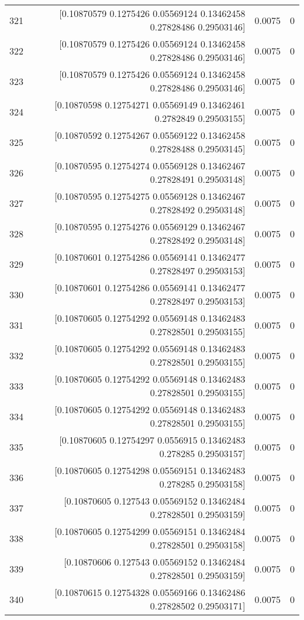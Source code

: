\begin{longtable}{lrrr}
321 & [0.10870579 0.1275426  0.05569124 0.13462458 0.27828486 0.29503146] & 0.0075 & 0 \\
322 & [0.10870579 0.1275426  0.05569124 0.13462458 0.27828486 0.29503146] & 0.0075 & 0 \\
323 & [0.10870579 0.1275426  0.05569124 0.13462458 0.27828486 0.29503146] & 0.0075 & 0 \\
324 & [0.10870598 0.12754271 0.05569149 0.13462461 0.2782849  0.29503155] & 0.0075 & 0 \\
325 & [0.10870592 0.12754267 0.05569122 0.13462458 0.27828488 0.29503145] & 0.0075 & 0 \\
326 & [0.10870595 0.12754274 0.05569128 0.13462467 0.27828491 0.29503148] & 0.0075 & 0 \\
327 & [0.10870595 0.12754275 0.05569128 0.13462467 0.27828492 0.29503148] & 0.0075 & 0 \\
328 & [0.10870595 0.12754276 0.05569129 0.13462467 0.27828492 0.29503148] & 0.0075 & 0 \\
329 & [0.10870601 0.12754286 0.05569141 0.13462477 0.27828497 0.29503153] & 0.0075 & 0 \\
330 & [0.10870601 0.12754286 0.05569141 0.13462477 0.27828497 0.29503153] & 0.0075 & 0 \\
331 & [0.10870605 0.12754292 0.05569148 0.13462483 0.27828501 0.29503155] & 0.0075 & 0 \\
332 & [0.10870605 0.12754292 0.05569148 0.13462483 0.27828501 0.29503155] & 0.0075 & 0 \\
333 & [0.10870605 0.12754292 0.05569148 0.13462483 0.27828501 0.29503155] & 0.0075 & 0 \\
334 & [0.10870605 0.12754292 0.05569148 0.13462483 0.27828501 0.29503155] & 0.0075 & 0 \\
335 & [0.10870605 0.12754297 0.0556915  0.13462483 0.278285   0.29503157] & 0.0075 & 0 \\
336 & [0.10870605 0.12754298 0.05569151 0.13462483 0.278285   0.29503158] & 0.0075 & 0 \\
337 & [0.10870605 0.127543   0.05569152 0.13462484 0.27828501 0.29503159] & 0.0075 & 0 \\
338 & [0.10870605 0.12754299 0.05569151 0.13462484 0.27828501 0.29503158] & 0.0075 & 0 \\
339 & [0.10870606 0.127543   0.05569152 0.13462484 0.27828501 0.29503159] & 0.0075 & 0 \\
340 & [0.10870615 0.12754328 0.05569166 0.13462486 0.27828502 0.29503171] & 0.0075 & 0 \\

\end{longtable}
